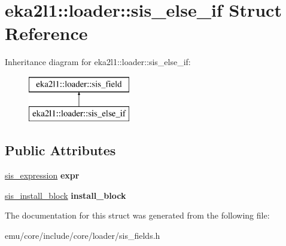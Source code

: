\hypertarget{structeka2l1_1_1loader_1_1sis__else__if}{}\section{eka2l1\+:\+:loader\+:\+:sis\+\_\+else\+\_\+if Struct Reference}
\label{structeka2l1_1_1loader_1_1sis__else__if}
Inheritance diagram for eka2l1\+:\+:loader\+:\+:sis\+\_\+else\+\_\+if\+:\begin{figure}[H]
\begin{center}
\leavevmode
\includegraphics[height=2.000000cm]{structeka2l1_1_1loader_1_1sis__else__if}
\end{center}
\end{figure}
\subsection*{Public Attributes}
\begin{DoxyCompactItemize}
\item 
\mbox{\label{structeka2l1_1_1loader_1_1sis__else__if_a100a583fdd313f8957db442364192cfe}} 
\mbox{\hyperlink{structeka2l1_1_1loader_1_1sis__expression}{sis\+\_\+expression}} {\bfseries expr}
\item 
\mbox{\label{structeka2l1_1_1loader_1_1sis__else__if_aa3b65e0601a8f4ca8d6e9b6212e7f803}} 
\mbox{\hyperlink{structeka2l1_1_1loader_1_1sis__install__block}{sis\+\_\+install\+\_\+block}} {\bfseries install\+\_\+block}
\end{DoxyCompactItemize}


The documentation for this struct was generated from the following file\+:\begin{DoxyCompactItemize}
\item 
emu/core/include/core/loader/sis\+\_\+fields.\+h\end{DoxyCompactItemize}
